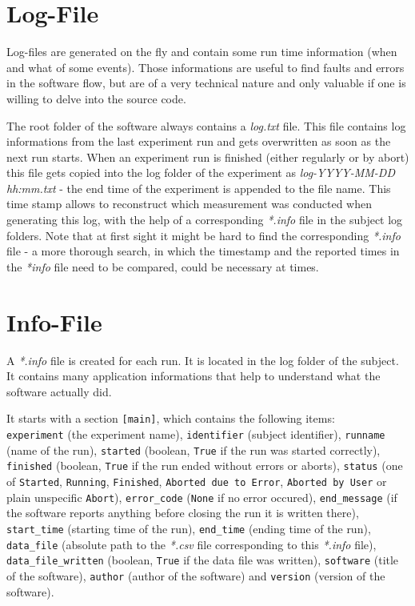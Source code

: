 \documentclass[12pt,a4paper]{book}
\begin{document}
\section{Log-File}

Log-files are generated on the fly and contain some run time information (when and what of some events). Those informations are useful to find faults and errors in the software flow, but are of a very technical nature and only valuable if one is willing to delve into the source code.

The root folder of the software always contains a \textit{log.txt} file. This file contains log informations from the last experiment run and gets overwritten as soon as the next run starts. When an experiment run is finished (either regularly or by abort) this file gets copied into the log folder of the experiment as \textit{log-YYYY-MM-DD hh:mm.txt} - the end time of the experiment is appended to the file name. This time stamp allows to reconstruct which measurement was conducted when generating this log, with the help of a corresponding \textit{*.info} file in the subject log folders. Note that at first sight it might be hard to find the corresponding \textit{*.info} file - a more thorough search, in which the timestamp and the reported times in the \textit{*info} file need to be compared, could be necessary at times.

\section{Info-File}

A \textit{*.info} file is created for each run. It is located in the log folder of the subject. It contains many application informations that help to understand what the software actually did.

It starts with a section \verb|[main]|, which contains the following items: \\
\verb|experiment| (the experiment name), \verb|identifier| (subject identifier), \verb|runname| (name of the run), \verb|started| (boolean, \verb|True| if the run was started correctly), \verb|finished| (boolean, \verb|True| if the run ended without errors or aborts), \verb|status| (one of \verb|Started|, \verb|Running|, \verb|Finished|, \verb|Aborted due to Error|, \verb|Aborted by User| or plain unspecific \verb|Abort|), \verb|error_code| (\verb|None| if no error occured), \verb|end_message| (if the software reports anything before closing the run it is written there), \verb|start_time| (starting time of the run), \verb|end_time| (ending time of the run), \verb|data_file| (absolute path to the \textit{*.csv} file corresponding to this \textit{*.info} file), \verb|data_file_written| (boolean, \verb|True| if the data file was written), \verb|software| (title of the software), \verb|author| (author of the software) and \verb|version| (version of the software).
\end{document}
